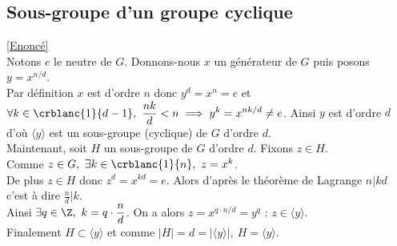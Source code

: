 \documentclass[8pt]{book}
\begin{document}
	\subsection{Sous-groupe d'un groupe cyclique }
	\textcolor{blue}{\hyperref[Sous-groupe d'un groupe cyclique]{[Enoncé]}}\\
	\label{Sous-groupe d'un groupe cyclique corrigé}
	Notons $e$ le neutre de $G$.
	Donnons-nous $x$ un générateur de $G$ puis posons $y=x^{n/d}$.\\
	Par définition $x$ est d'ordre $n$ donc $y^d=x^n=e$ et $\forall k\in \crblanc{1}{d-1},\ \displaystyle\frac{nk}{d}<n\implies y^k=x^{nk/d}\ne e$. Ainsi $y$ est d'ordre $d$ d'où $\langle y\rangle$ est un sous-groupe (cyclique) de $G$ d'ordre $d$.\\
	Maintenant, soit $H$ un sous-groupe de $G$ d'ordre $d$. Fixons $z\in H$.\\
	Comme $z\in G,\ \exists k\in \crblanc{1}{n},\ z=x^k$.\\
	De plus $z\in H$ donc $z^d=x^{kd}=e$. Alors d'après le théorème de Lagrange $n|kd$ c'est à dire $\displaystyle\frac{n}{d}|k$.\\
	Ainsi $\exists q\in \Z,\ k=q\cdot\displaystyle\frac{n}{d}$. On a alors $z=x^{q\cdot n/d}=y^q$ : $z\in \langle y\rangle$.\\
	Finalement $H\subset \langle y\rangle$ et comme $|H|=d=|\langle y\rangle|,\ H=\langle y\rangle$.
	
\end{document}
